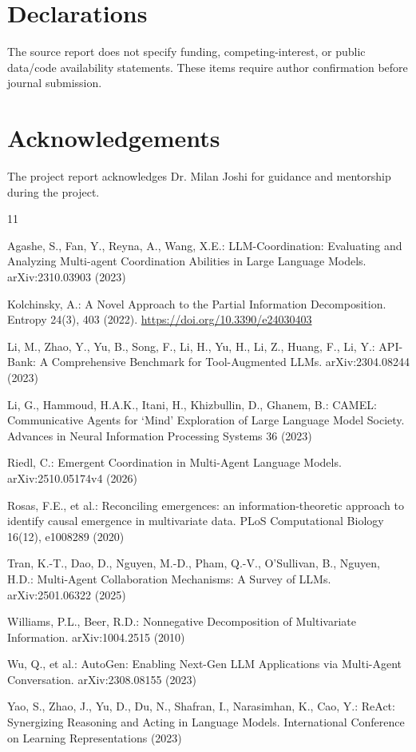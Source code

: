 \documentclass[pdflatex,sn-basic,Numbered]{sn-jnl}
\begin{document}
\section*{Declarations}

The source report does not specify funding, competing-interest, or public data/code availability statements. These items require author confirmation before journal submission.

\section*{Acknowledgements}

The project report acknowledges Dr. Milan Joshi for guidance and mentorship during the project.

\begin{thebibliography}{11}

Agashe, S., Fan, Y., Reyna, A., Wang, X.E.: LLM-Coordination: Evaluating and Analyzing Multi-agent Coordination Abilities in Large Language Models. arXiv:2310.03903 (2023)

Kolchinsky, A.: A Novel Approach to the Partial Information Decomposition. Entropy 24(3), 403 (2022). \url{https://doi.org/10.3390/e24030403}

Li, M., Zhao, Y., Yu, B., Song, F., Li, H., Yu, H., Li, Z., Huang, F., Li, Y.: API-Bank: A Comprehensive Benchmark for Tool-Augmented LLMs. arXiv:2304.08244 (2023)

Li, G., Hammoud, H.A.K., Itani, H., Khizbullin, D., Ghanem, B.: CAMEL: Communicative Agents for `Mind' Exploration of Large Language Model Society. Advances in Neural Information Processing Systems 36 (2023)

Riedl, C.: Emergent Coordination in Multi-Agent Language Models. arXiv:2510.05174v4 (2026)

Rosas, F.E., et al.: Reconciling emergences: an information-theoretic approach to identify causal emergence in multivariate data. PLoS Computational Biology 16(12), e1008289 (2020)

Tran, K.-T., Dao, D., Nguyen, M.-D., Pham, Q.-V., O'Sullivan, B., Nguyen, H.D.: Multi-Agent Collaboration Mechanisms: A Survey of LLMs. arXiv:2501.06322 (2025)

Williams, P.L., Beer, R.D.: Nonnegative Decomposition of Multivariate Information. arXiv:1004.2515 (2010)

Wu, Q., et al.: AutoGen: Enabling Next-Gen LLM Applications via Multi-Agent Conversation. arXiv:2308.08155 (2023)

Yao, S., Zhao, J., Yu, D., Du, N., Shafran, I., Narasimhan, K., Cao, Y.: ReAct: Synergizing Reasoning and Acting in Language Models. International Conference on Learning Representations (2023)

\end{thebibliography}
\end{document}

